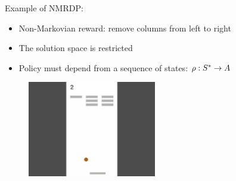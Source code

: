 \documentclass{beamer}
\begin{document}


\begin{frame}{Example of NMRDP: \Breakout}
	\begin{itemize}
		\item Non-Markovian reward: remove columns from left to right
		\item The solution space is restricted
		\item Policy must depend from a sequence of states: $\rho: S^* \to A$
	\end{itemize}

	\begin{figure}
		\centering
		\includegraphics[width=0.5\textwidth]{images/breakout.jpg}
	\end{figure}
\end{frame}
\end{document}
